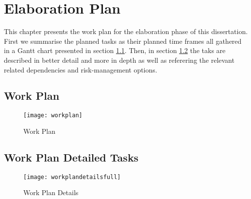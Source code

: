 \chapter{Elaboration Plan}
\label{cha:elaboration_plan}

This chapter presents the work plan for the elaboration phase of this dissertation. First we summarise the planned tasks as their planned time frames all gathered in a Gantt chart presented in section \ref{sec:workplan}. Then, in section \ref{sec:workplan_details} the taks are described in better detail and more in depth as well as referering the relevant related dependencies and risk-management options.

\section{Work Plan}
\label{sec:workplan}

\begin{figure}[htbp]
	\centerline{\texttt{[image: workplan]}}%
	\label{fig:workplan}
	\caption{Work Plan}
\end{figure}

\section{Work Plan Detailed Tasks}
\label{sec:workplan_details}

\begin{figure}[htbp]
	\centerline{\texttt{[image: workplandetailsfull]}}%
	\label{fig:workplan_details}
	\caption{Work Plan Details}
\end{figure}